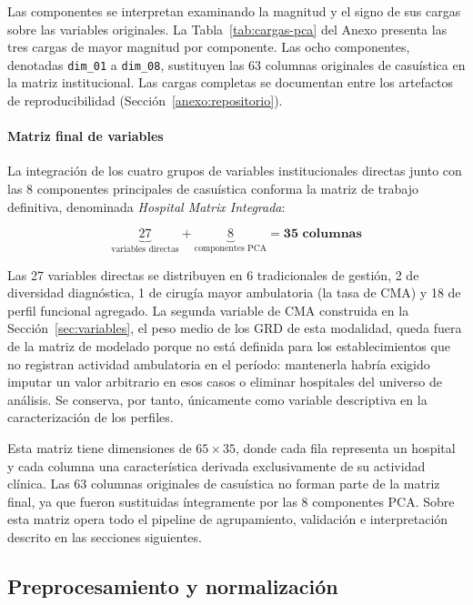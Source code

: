 Las componentes se interpretan examinando la magnitud y el signo de sus cargas
sobre las variables originales. La Tabla~\ref{tab:cargas-pca} del Anexo
presenta las tres cargas de mayor magnitud por componente. Las ocho componentes,
denotadas \texttt{dim\_01} a \texttt{dim\_08}, sustituyen las 63 columnas
originales de casuística en la matriz institucional. Las cargas completas se
documentan entre los artefactos de reproducibilidad
(Sección~\ref{anexo:repositorio}).

\paragraph{Matriz final de variables}
\label{sec:matriz-final}
La integración de los cuatro grupos de
variables institucionales directas junto con las 8 componentes principales de
casuística conforma la matriz de trabajo definitiva, denominada
\textit{Hospital Matrix Integrada}:

\begin{equation}
  \underbrace{27}_{\text{variables directas}} + \underbrace{8}_{\text{componentes PCA}} = \mathbf{35 \text{ columnas}}
\end{equation}

Las 27 variables directas se distribuyen en 6 tradicionales de gestión, 2 de
diversidad diagnóstica, 1 de cirugía mayor ambulatoria (la tasa de CMA) y 18 de
perfil funcional agregado. La segunda variable de CMA construida en la
Sección~\ref{sec:variables}, el peso medio de los GRD de esta modalidad, queda
fuera de la matriz de modelado porque no está definida para los establecimientos
que no registran actividad ambulatoria en el período: mantenerla habría exigido
imputar un valor arbitrario en esos casos o eliminar hospitales del universo de
análisis. Se conserva, por tanto, únicamente como variable descriptiva en la
caracterización de los perfiles.

Esta matriz tiene dimensiones de $65 \times 35$, donde cada fila representa un
hospital y cada columna una característica derivada exclusivamente de su actividad
clínica. Las 63 columnas originales de casuística no forman parte de la matriz
final, ya que fueron sustituidas íntegramente por las 8 componentes PCA. Sobre esta
matriz opera todo el pipeline de agrupamiento, validación e interpretación
descrito en las secciones siguientes.

\subsection{Preprocesamiento y normalización}
\label{sec:preprocesamiento}

